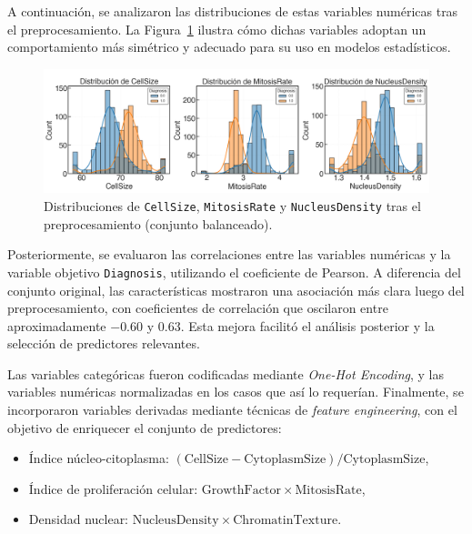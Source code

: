 \begin{multicols}{2}
A continuación, se analizaron las distribuciones de estas variables numéricas tras el preprocesamiento. La Figura~\ref{fig:distribution-fig} ilustra cómo dichas variables adoptan un comportamiento más simétrico y adecuado para su uso en modelos estadísticos.

\begin{figure}[H]
    \centering
    \includegraphics[width=1\linewidth]{figures/p1/numerical_distributions_outliers_balanced.png}
    \caption{Distribuciones de \texttt{CellSize}, \texttt{MitosisRate} y \texttt{NucleusDensity} tras el preprocesamiento (conjunto balanceado).}
    \label{fig:distribution-fig}
\end{figure}


Posteriormente, se evaluaron las correlaciones entre las variables numéricas y la variable objetivo \texttt{Diagnosis}, utilizando el coeficiente de Pearson. A diferencia del conjunto original, las características mostraron una asociación más clara luego del preprocesamiento, con coeficientes de correlación que oscilaron entre aproximadamente $-0.60$ y $0.63$. Esta mejora facilitó el análisis posterior y la selección de predictores relevantes.

Las variables categóricas fueron codificadas mediante \textit{One-Hot Encoding}, y las variables numéricas normalizadas en los casos que así lo requerían. Finalmente, se incorporaron variables derivadas mediante técnicas de \textit{feature engineering}, con el objetivo de enriquecer el conjunto de predictores:

\begin{itemize}
    \item Índice núcleo-citoplasma: \((\mathrm{CellSize} - \mathrm{CytoplasmSize}) / \mathrm{CytoplasmSize}\),
    \item Índice de proliferación celular: \(\mathrm{GrowthFactor} \times \mathrm{MitosisRate}\),
    \item Densidad nuclear: \(\mathrm{NucleusDensity} \times \mathrm{ChromatinTexture}\).
\end{itemize}



\end{multicols}
